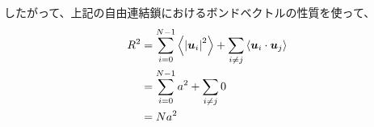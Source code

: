 \documentclass[11pt]{jsarticle}
\begin{document}
\begin{itemize}
\begin{enumerate}
	したがって、上記の自由連結鎖におけるボンドベクトルの性質を使って、
	\begin{align*}
	R^2
	&=\sum_{i=0}^{N-1} \left\langle \left|\bm{u}_i \right|^2 \right\rangle 
	+\sum_{i \neq j} \left\langle \bm{u}_i \cdot \bm{u}_j \right\rangle \notag \\
	&=\sum_{i=0}^{N-1} a^2 + \sum_{i \neq j} 0 \notag \\
	&= N a^2
	\end{align*}
	\end{enumerate}

%
%
%
%

\end{itemize}
\end{document}
